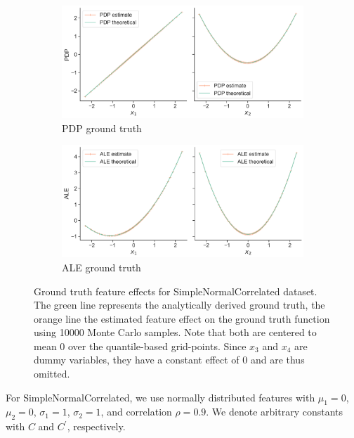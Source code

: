 \documentclass[runningheads]{llncs}
\begin{document}
\begin{figure}[h!]
    \begin{subfigure}[b]{0.49\textwidth}
        \centering
        \includegraphics[width=\textwidth]{img/SNC-all/pdp_groundtruth_comparison.png}
        \caption{PDP ground truth}
    \end{subfigure}
    \begin{subfigure}[b]{0.49\textwidth}
        \centering
        \includegraphics[width=\textwidth]{img/SNC-all/ale_groundtruth_comparison.png}
        \caption{ALE ground truth}
    \end{subfigure}
    \caption{Ground truth feature effects for SimpleNormalCorrelated dataset. The green line
    represents the analytically derived ground truth, the orange line the estimated feature
    effect on the ground truth function using 10000 Monte Carlo samples. Note that both
    are centered to mean 0 over the quantile-based grid-points.
    Since $x_3$ and $x_4$ are dummy variables, they have a constant effect of 0 and are
    thus omitted.}
    \label{fig:snc-groundtruth}  %
\end{figure}

\noindent For SimpleNormalCorrelated, we use normally distributed features with $\mu_1 = 0$,
$\mu_2 = 0$, $\sigma_1 = 1$, $\sigma_2 = 1$, and correlation
$\rho = 0.9$. We denote
arbitrary constants with $C$ and $C^\prime$, respectively.
\end{document}
